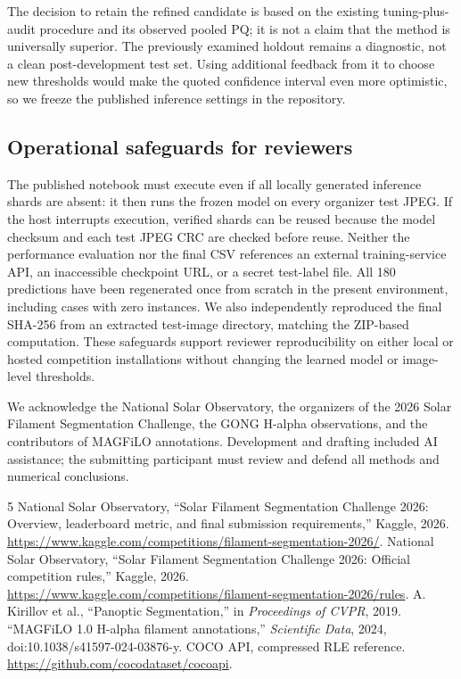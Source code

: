 \documentclass[sigconf,nonacm]{acmart}
\begin{document}
The decision to retain the refined candidate is based on the existing tuning-plus-audit procedure and its observed pooled PQ; it is not a claim that the method is universally superior. The previously examined holdout remains a diagnostic, not a clean post-development test set. Using additional feedback from it to choose new thresholds would make the quoted confidence interval even more optimistic, so we freeze the published inference settings in the repository.

\subsection{Operational safeguards for reviewers}
The published notebook must execute even if all locally generated inference shards are absent: it then runs the frozen model on every organizer test JPEG. If the host interrupts execution, verified shards can be reused because the model checksum and each test JPEG CRC are checked before reuse. Neither the performance evaluation nor the final CSV references an external training-service API, an inaccessible checkpoint URL, or a secret test-label file. All 180 predictions have been regenerated once from scratch in the present environment, including cases with zero instances. We also independently reproduced the final SHA-256 from an extracted test-image directory, matching the ZIP-based computation. These safeguards support reviewer reproducibility on either local or hosted competition installations without changing the learned model or image-level thresholds.

\begin{acks}
We acknowledge the National Solar Observatory, the organizers of the 2026 Solar Filament Segmentation Challenge, the GONG H-alpha observations, and the contributors of MAGFiLO annotations. Development and drafting included AI assistance; the submitting participant must review and defend all methods and numerical conclusions.
\end{acks}
\begin{thebibliography}{5}
 National Solar Observatory, ``Solar Filament Segmentation Challenge 2026: Overview, leaderboard metric, and final submission requirements,'' Kaggle, 2026. \url{https://www.kaggle.com/competitions/filament-segmentation-2026/}.
 National Solar Observatory, ``Solar Filament Segmentation Challenge 2026: Official competition rules,'' Kaggle, 2026. \url{https://www.kaggle.com/competitions/filament-segmentation-2026/rules}.
 A. Kirillov et al., ``Panoptic Segmentation,'' in \emph{Proceedings of CVPR}, 2019.
 ``MAGFiLO 1.0 H-alpha filament annotations,'' \emph{Scientific Data}, 2024, doi:10.1038/s41597-024-03876-y.
 COCO API, compressed RLE reference. \url{https://github.com/cocodataset/cocoapi}.
\end{thebibliography}
\end{document}
